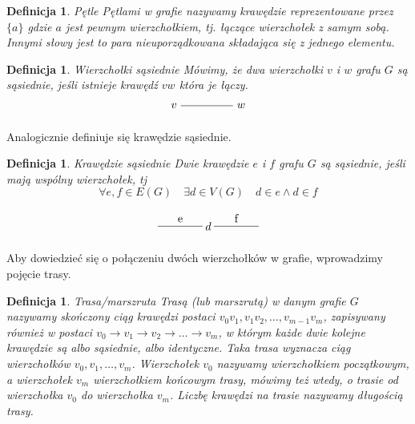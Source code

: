\documentclass[12pt,a4paper]{report}
\newtheorem{definition}[theorem]{Definicja}
\begin{document}
\begin{definition}{Pętle \cite[Rozdział 2]{wilson2008}}
Pętlami w grafie nazywamy krawędzie reprezentowane przez $\{a\}$ gdzie $a$ jest pewnym wierzchołkiem, tj. łączące wierzchołek z samym sobą. Innymi słowy jest to para nieuporządkowana składająca się z jednego elementu.
\end{definition}



\begin{definition}{Wierzchołki sąsiednie \cite[Rozdział 2]{wilson2008}}
Mówimy, że dwa wierzchołki $v$ i $w$ grafu $G$ są sąsiednie, jeśli istnieje krawędź $vw$ która je łączy. 
$$
\begin{tikzpicture}[scale=.7]
  \node (v) at (-2,0) {$v$};
  \node (w) at (1,0) {$w$};
  \draw (v)--(w); 
  
\end{tikzpicture}
$$
\end{definition}

Analogicznie definiuje się krawędzie sąsiednie.



\begin{definition}{Krawędzie sąsiednie \cite[Rozdział 2]{wilson2008}}
Dwie krawędzie $e$ i $f$ grafu $G$ są sąsiednie, jeśli mają wspólny wierzchołek, tj
$$
\forall{e, f} \in E(G) \quad \exists{d}\in V(G) \quad d \in e \land d\in f
$$

$$
\begin{tikzpicture}[scale=.7]
  \draw (-1.75,0)-- node[above] {f} ++(2,0);
  \draw node(d) at (-2,0) {$d$};
  \draw (-4.25,0) --node[above] {e} ++(2,0);
\end{tikzpicture}
$$
\end{definition}



Aby dowiedzieć się o połączeniu dwóch wierzchołków w grafie, wprowadzimy pojęcie trasy.


\begin{definition}{Trasa/marszruta \cite[Rozdział 3]{wilson2008}}
Trasą (lub marszrutą) w danym grafie $G$ nazywamy skończony ciąg krawędzi postaci $v_{0}v_{1}, v_{1}v_{2}, \ldots,v_{m-1}v_{m}$, zapisywany również w postaci $v_{0} \rightarrow{} v_{1} \rightarrow{} v_{2} \rightarrow{} \ldots \rightarrow{} v_{m}$, w którym każde dwie kolejne krawędzie są albo sąsiednie, albo identyczne. Taka trasa wyznacza ciąg wierzchołków $v_{0}, v_{1}, \ldots, v_{m}$. Wierzchołek $v_{0}$ nazywamy wierzchołkiem początkowym, a wierzchołek $v_{m}$ wierzchołkiem końcowym trasy, mówimy też wtedy, o trasie od wierzchołka $v_{0}$ do wierzchołka $v_{m}$. Liczbę krawędzi na trasie nazywamy długością trasy. 
\end{definition}
\end{document}

